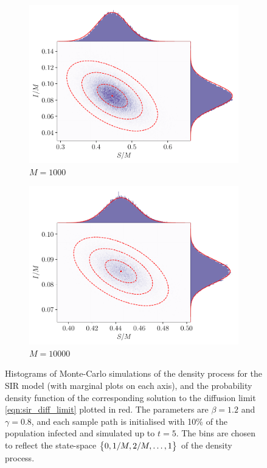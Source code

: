 \begin{figure}
\begin{center}
\begin{subfigure}{0.49\textwidth}
			\includegraphics[width=\textwidth]{chp06_applications/figures/sir/sir_pairwise_1000}
			\caption{\(M = 1000\)}
			\label{fig:sir_gauss_rels_3}
		\end{subfigure}\begin{subfigure}{0.49\textwidth}
			\includegraphics[width=\textwidth]{chp06_applications/figures/sir/sir_pairwise_10000}
			\caption{\(M = 10000\)}
			\label{fig:sir_gauss_rels_4}
		\end{subfigure}
		\caption{Histograms of Monte-Carlo simulations of the density process for the SIR model (with marginal plots on each axis), and the probability density function of the corresponding solution to the diffusion limit \cref{eqn:sir_diff_limit} plotted in red.
			The parameters are \(\beta = 1.2\) and \(\gamma = 0.8\), and each sample path is initialised with 10\% of the population infected and simulated up to \(t = 5\).
			The bins are chosen to reflect the state-space \(\set{0, 1/M, 2/M, \dotsc, 1}\) of the density process.}
		\label{fig:sir_gauss_rels}
	\end{center}
\end{figure}


